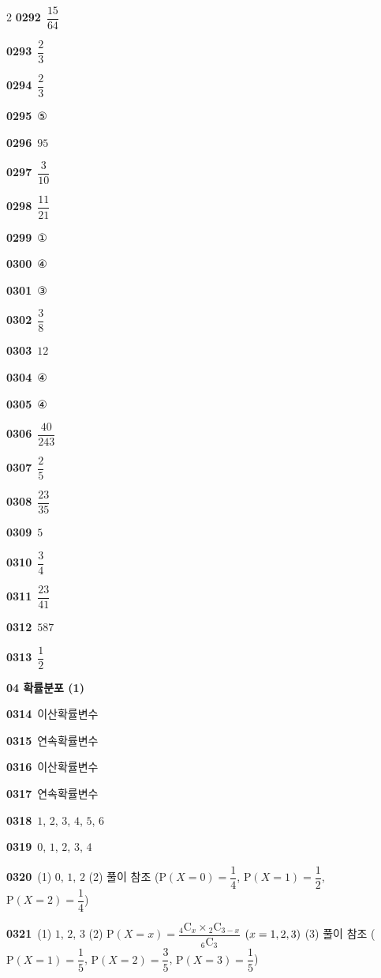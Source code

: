 \documentclass[10pt,a4paper]{article}
\begin{document}
\begin{multicols}{2}
\noindent\textbf{0292}\ $\dfrac{15}{64}$\par
\noindent\textbf{0293}\ $\dfrac{2}{3}$\par
\noindent\textbf{0294}\ $\dfrac{2}{3}$\par
\noindent\textbf{0295}\ ⑤\par
\noindent\textbf{0296}\ $95$\par
\noindent\textbf{0297}\ $\dfrac{3}{10}$\par
\noindent\textbf{0298}\ $\dfrac{11}{21}$\par
\noindent\textbf{0299}\ ①\par
\noindent\textbf{0300}\ ④\par
\noindent\textbf{0301}\ ③\par
\noindent\textbf{0302}\ $\dfrac{3}{8}$\par
\noindent\textbf{0303}\ $12$\par
\noindent\textbf{0304}\ ④\par
\noindent\textbf{0305}\ ④\par
\noindent\textbf{0306}\ $\dfrac{40}{243}$\par
\noindent\textbf{0307}\ $\dfrac{2}{5}$\par
\noindent\textbf{0308}\ $\dfrac{23}{35}$\par
\noindent\textbf{0309}\ $5$\par
\noindent\textbf{0310}\ $\dfrac{3}{4}$\par
\noindent\textbf{0311}\ $\dfrac{23}{41}$\par
\noindent\textbf{0312}\ $587$\par
\noindent\textbf{0313}\ $\dfrac{1}{2}$\par
\noindent\textbf{04 확률분포 (1)}\par\smallskip
\noindent\textbf{0314}\ 이산확률변수\par
\noindent\textbf{0315}\ 연속확률변수\par
\noindent\textbf{0316}\ 이산확률변수\par
\noindent\textbf{0317}\ 연속확률변수\par
\noindent\textbf{0318}\ $1$, $2$, $3$, $4$, $5$, $6$\par
\noindent\textbf{0319}\ $0$, $1$, $2$, $3$, $4$\par
\noindent\textbf{0320}\ (1) $0$, $1$, $2$ (2) 풀이 참조 ($\mathrm{P}(X=0)=\dfrac{1}{4}$, $\mathrm{P}(X=1)=\dfrac{1}{2}$, $\mathrm{P}(X=2)=\dfrac{1}{4}$)\par
\noindent\textbf{0321}\ (1) $1$, $2$, $3$ (2) $\mathrm{P}(X=x)=\dfrac{{}_4\mathrm{C}_x\times{}_2\mathrm{C}_{3-x}}{{}_6\mathrm{C}_3}$ $(x=1{,}\mkern3mu\mathopen{}2{,}\mkern3mu\mathopen{}3)$ (3) 풀이 참조 ($\mathrm{P}(X=1)=\dfrac{1}{5}$, $\mathrm{P}(X=2)=\dfrac{3}{5}$, $\mathrm{P}(X=3)=\dfrac{1}{5}$)\par

\end{multicols}
\end{document}
